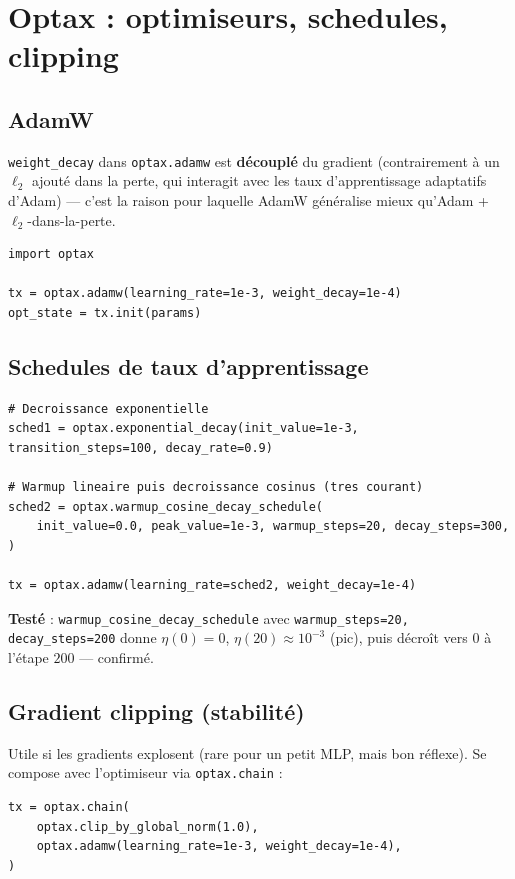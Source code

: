 \documentclass[11pt,a4paper]{article}
\begin{document}
\section{Optax : optimiseurs, schedules, clipping}
\label{sec:optax}

\subsection{AdamW}
\texttt{weight\_decay} dans \texttt{optax.adamw} est \textbf{découplé} du
gradient (contrairement à un $\ell_2$ ajouté dans la perte, qui interagit
avec les taux d'apprentissage adaptatifs d'Adam) --- c'est la raison pour
laquelle AdamW généralise mieux qu'Adam + $\ell_2$-dans-la-perte.

\begin{lstlisting}
import optax

tx = optax.adamw(learning_rate=1e-3, weight_decay=1e-4)
opt_state = tx.init(params)
\end{lstlisting}

\subsection{Schedules de taux d'apprentissage}
\begin{lstlisting}
# Decroissance exponentielle
sched1 = optax.exponential_decay(init_value=1e-3, transition_steps=100, decay_rate=0.9)

# Warmup lineaire puis decroissance cosinus (tres courant)
sched2 = optax.warmup_cosine_decay_schedule(
    init_value=0.0, peak_value=1e-3, warmup_steps=20, decay_steps=300,
)

tx = optax.adamw(learning_rate=sched2, weight_decay=1e-4)
\end{lstlisting}

\begin{mdframed}
\textbf{Testé} : \texttt{warmup\_cosine\_decay\_schedule} avec
\texttt{warmup\_steps=20, decay\_steps=200} donne
$\eta(0){=}0$, $\eta(20){\approx}10^{-3}$ (pic), puis décroît vers $0$ à
l'étape $200$ --- confirmé.
\end{mdframed}

\subsection{Gradient clipping (stabilité)}
Utile si les gradients explosent (rare pour un petit MLP, mais bon réflexe).
Se compose avec l'optimiseur via \texttt{optax.chain} :
\begin{lstlisting}
tx = optax.chain(
    optax.clip_by_global_norm(1.0),
    optax.adamw(learning_rate=1e-3, weight_decay=1e-4),
)
\end{lstlisting}
\end{document}
